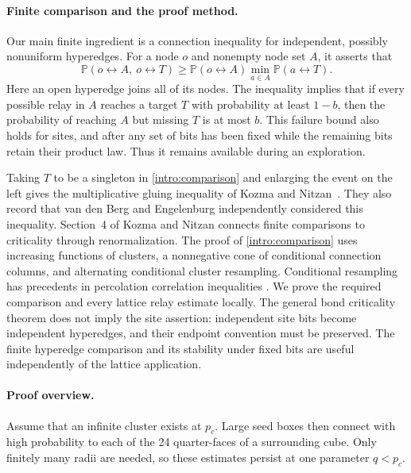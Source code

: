 \paragraph{Finite comparison and the proof method.}
Our main finite ingredient is a connection inequality for independent,
possibly nonuniform hyperedges. For a node $o$ and nonempty node set $A$,
it asserts that
\begin{equation}\label{intro:comparison}
 \mathbb P(o\leftrightarrow A,\ o\leftrightarrow T)
 \ge \mathbb P(o\leftrightarrow A)
          \min_{a\in A}\mathbb P(a\leftrightarrow T).
\end{equation}
Here an open hyperedge joins all of its nodes. The inequality implies that
if every possible relay in $A$ reaches a target $T$ with probability at
least $1-b$, then the probability of reaching $A$ but missing $T$ is at
most $b$. This failure bound also holds for sites, and after any set of bits
has been fixed while the remaining bits retain their product law. Thus it
remains available during an exploration.

Taking $T$ to be a singleton in \eqref{intro:comparison} and enlarging
the event on the left gives the multiplicative gluing inequality of
Kozma and Nitzan~\cite[Conjecture~1]{KozmaNitzan2024}.
They also record that van den Berg and Engelenburg independently
considered this inequality. Section~4 of Kozma and Nitzan connects finite comparisons
to criticality through renormalization. The proof of
\eqref{intro:comparison} uses increasing functions of clusters, a
nonnegative cone of conditional connection columns, and alternating
conditional cluster resampling. Conditional resampling has precedents in
percolation correlation inequalities \cite[Section~2.1]{BHK2006}.
We prove the required comparison and every lattice relay estimate locally.
The general bond criticality theorem does not imply the site assertion:
independent site bits become independent hyperedges, and their endpoint
convention must be preserved. The finite hyperedge comparison
and its stability under fixed bits are useful independently of the lattice
application.

\paragraph{Proof overview.}
Assume that an infinite cluster exists at $p_c$. Large seed boxes then
connect with high probability to each of the 24 quarter-faces of a surrounding
cube. Only finitely many radii are needed, so these estimates persist at one
parameter $q<p_c$.

